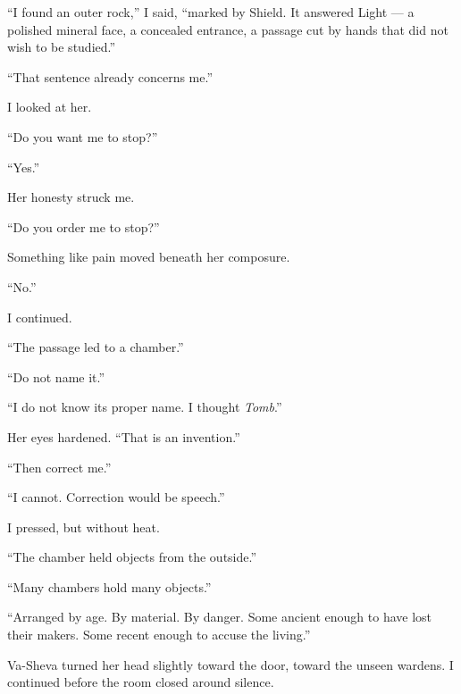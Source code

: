``I found an outer rock,'' I said, ``marked by Shield. It answered Light --- a polished mineral face, a concealed entrance, a passage cut by hands that did not wish to be studied.''\par

``That sentence already concerns me.''\par

I looked at her.\par

``Do you want me to stop?''\par

``Yes.''\par

Her honesty struck me.\par

``Do you order me to stop?''\par

Something like pain moved beneath her composure.\par

``No.''\par

I continued.\par

``The passage led to a chamber.''\par

``Do not name it.''\par

``I do not know its proper name. I thought \emph{Tomb}.''\par

Her eyes hardened. ``That is an invention.''\par

``Then correct me.''\par

``I cannot. Correction would be speech.''\par

I pressed, but without heat.\par

``The chamber held objects from the outside.''\par

``Many chambers hold many objects.''\par

``Arranged by age. By material. By danger. Some ancient enough to have lost their makers. Some recent enough to accuse the living.''\par

Va-Sheva turned her head slightly toward the door, toward the unseen wardens. I continued before the room closed around silence.\par

